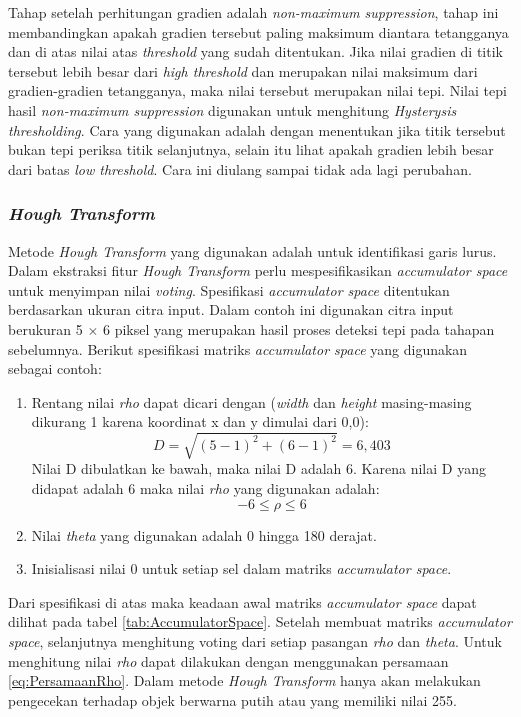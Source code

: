 \noindent Tahap setelah perhitungan gradien adalah \textit{non-maximum suppression}, tahap ini membandingkan apakah gradien tersebut paling maksimum diantara tetangganya dan di atas nilai atas \textit{threshold} yang sudah ditentukan. Jika nilai gradien di titik tersebut lebih besar dari \textit{high threshold} dan merupakan nilai maksimum dari gradien-gradien tetangganya, maka nilai tersebut merupakan nilai tepi. Nilai tepi hasil \textit{non-maximum suppression} digunakan untuk menghitung \textit{Hysterysis thresholding}. Cara yang digunakan adalah dengan menentukan jika titik tersebut bukan tepi periksa titik selanjutnya, selain itu lihat apakah gradien lebih besar dari batas \textit{low threshold}. Cara ini diulang sampai tidak ada lagi perubahan.\\

\subsubsection{\textit{Hough Transform}}
\noindent Metode \textit{Hough Transform} yang digunakan adalah untuk identifikasi garis lurus. Dalam ekstraksi fitur \textit{Hough Transform} perlu mespesifikasikan \textit{accumulator space} untuk menyimpan nilai \textit{voting}. Spesifikasi \textit{accumulator space} ditentukan berdasarkan ukuran citra input. Dalam contoh ini digunakan citra input berukuran 5 $\times$ 6 piksel yang merupakan hasil proses deteksi tepi pada tahapan sebelumnya. Berikut spesifikasi matriks \textit{accumulator space} yang digunakan sebagai contoh:
\begin{enumerate}
\item Rentang nilai \textit{rho} dapat dicari dengan (\textit{width} dan \textit{height} masing-masing dikurang 1 karena koordinat x dan y dimulai dari 0,0):
\begin{equation*}
	D = \sqrt{(5-1)^2 + (6-1)^2} = 6,403
\end{equation*}
Nilai D dibulatkan ke bawah, maka nilai D adalah 6. Karena nilai D yang didapat adalah 6 maka nilai \textit{rho} yang digunakan adalah:
\begin{equation*}
	-6 \leq \rho \leq 6
\end{equation*}
\item Nilai \textit{theta} yang digunakan adalah 0 hingga 180 derajat.
\item Inisialisasi nilai 0 untuk setiap sel dalam matriks \textit{accumulator space}.
\end{enumerate}
\noindent Dari spesifikasi di atas maka keadaan awal matriks \textit{accumulator space} dapat dilihat pada tabel \ref{tab:AccumulatorSpace}. Setelah membuat matriks \textit{accumulator space}, selanjutnya menghitung voting dari setiap pasangan \textit{rho} dan \textit{theta}. Untuk menghitung nilai \textit{rho} dapat dilakukan dengan menggunakan persamaan \ref{eq:PersamaanRho}. Dalam metode \textit{Hough Transform} hanya akan melakukan pengecekan terhadap objek berwarna putih atau yang memiliki nilai 255.

